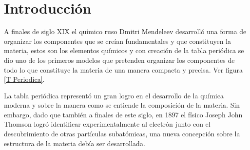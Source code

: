 \documentclass[journal]{IEEEtran}
\begin{document}
\section{Introducción}

A finales de siglo XIX el químico ruso Dmitri Mendeleev desarrolló una forma de organizar los componentes que se creían fundamentales y que constituyen la materia, estos son los elementos químicos y con creación de la tabla periódica se dio uno de los primeros modelos que pretenden organizar los componentes de todo lo que constituye la materia de una manera compacta y precisa. Ver figura \ref{T Periodica}.

La tabla periódica representó un gran logro en el desarrollo de la química moderna y sobre la manera como se entiende la composición de la materia. Sin embargo, dado que también a finales de este siglo, en 1897 el físico Joseph John Thomson logró identificar experimentalmente al electrón junto con el descubrimiento de otras partículas subatómicas, una nueva concepción sobre la estructura de la materia debía ser desarrollada. 
\end{document}
